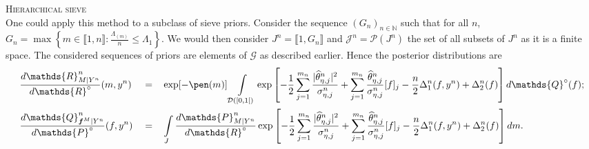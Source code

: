 \begin{ex}{\textsc{Hierarchical sieve\\}}\label{ex2.6.1}
One could apply this method to a subclass of sieve priors.
Consider the sequence $\left(G_{n}\right)_{n \in \mathds{N}}$ such that for all $n$, $G_{n} = \max\left\{m \in \llbracket 1, n \rrbracket : \frac{\Lambda_{(m)}}{n} \leq \Lambda_{1}\right\}$.
We would then consider $J^{n} = \llbracket 1, G_{n} \rrbracket$ and $\mathcal{J}^{n} = \mathcal{P}(J^{n})$ the set of all subsets of $J^{n}$ as it is a finite space.
The considered sequences of priors are elements of $\mathcal{G}$ as described earlier.
Hence the posterior distributions are
\begin{alignat*}{3}
& \frac{d\mathds{R}_{M \vert Y^{n}}^{n}}{d\mathds{R}^{\circ}}(m, y^{n}) &&=&& \exp[-\pen(m)] \int\limits_{\mathcal{D}([0,1[)}\exp\left[-\frac{1}{2}\sum\limits_{j = 1}^{m_{n}} \frac{\vert \widehat{\theta}_{\eta, j}^{n}\vert^{2}}{\sigma_{\eta, j}^{n}} + \sum\limits_{j = 1}^{m_{n}} \frac{\widehat{\theta}_{\eta, j}^{n}}{\sigma_{\eta, j}^{n}}[f]_{j} - \frac{n}{2} \Delta_{1}^{n}(f, y^{n}) +\Delta_{2}^{n}(f)\right] d\mathds{Q}^{\circ}(f);\\
&\frac{d\mathds{Q}_{\boldsymbol{f}^{M} \vert Y^{n}}^{n}}{d\mathds{P}^{\circ}}(f, y^{n}) &&=&& \int\limits_{J} \frac{d\mathds{P}_{M \vert Y^{n}}^{n}}{d\mathds{R}^{\circ}} \exp\left[-\frac{1}{2}\sum\limits_{j = 1}^{m_{n}} \frac{\vert \widehat{\theta}_{\eta, j}^{n}\vert^{2}}{\sigma_{\eta, j}^{n}} + \sum\limits_{j = 1}^{m_{n}} \frac{\widehat{\theta}_{\eta, j}^{n}}{\sigma_{\eta, j}^{n}}[f]_{j} - \frac{n}{2} \Delta_{1}^{n}(f, y^{n}) +\Delta_{2}^{n}(f)\right] dm.
\end{alignat*}
\end{ex}